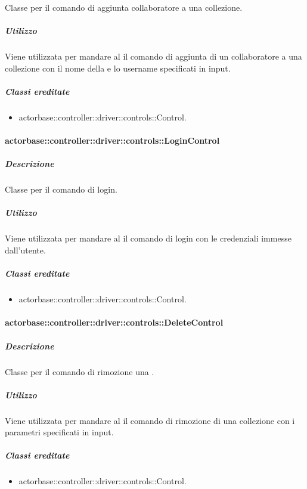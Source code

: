 \documentclass{scalatekids-article}
\begin{document}
Classe per il comando di aggiunta collaboratore a una collezione.

\subparagraph{Utilizzo}

Viene utilizzata per mandare al  il comando di aggiunta di un collaboratore a una collezione con il nome della  e lo username specificati in input.

\subparagraph{Classi ereditate}

\begin{itemize}
\item actorbase::controller::driver::controls::Control.
\end{itemize}

\paragraph{actorbase::controller::driver::controls::LoginControl}

\subparagraph{Descrizione}

Classe per il comando di login.

\subparagraph{Utilizzo}

Viene utilizzata per mandare al  il comando di login con le credenziali immesse dall'utente.

\subparagraph{Classi ereditate}

\begin{itemize}
\item actorbase::controller::driver::controls::Control.
\end{itemize}

\paragraph{actorbase::controller::driver::controls::DeleteControl}

\subparagraph{Descrizione}

Classe per il comando di rimozione una .

\subparagraph{Utilizzo}

Viene utilizzata per mandare al  il comando di rimozione di una collezione con i parametri specificati in input.

\subparagraph{Classi ereditate}

\begin{itemize}
\item actorbase::controller::driver::controls::Control.
\end{itemize}
\end{document}
